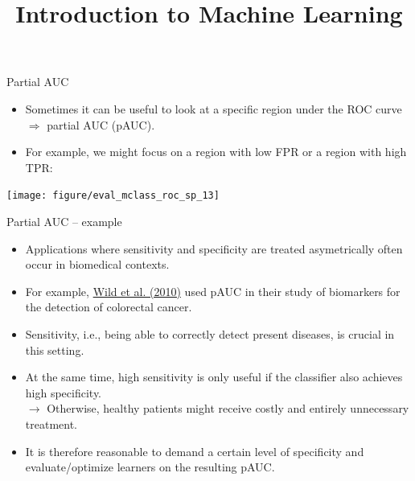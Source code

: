 \documentclass[11pt,compress,t,notes=noshow, xcolor=table]{beamer}
\title{Introduction to Machine Learning}
\institute{\href{https://compstat-lmu.github.io/lecture_i2ml/}{compstat-lmu.github.io/lecture\_i2ml}}
\date{}
\newenvironment{knitrout}{}{} %
\begin{document}








\begin{vbframe}{Partial AUC}

\begin{itemize}
  \item Sometimes it can be useful to look at a specific region under the ROC 
  curve $\Rightarrow$ partial AUC (pAUC).
  \item For example, we might focus on a region with low FPR or a region with 
  high TPR:
\end{itemize}

\begin{knitrout}\scriptsize
{}\color{fgcolor}
{\centering \texttt{[image: figure/eval\_mclass\_roc\_sp\_13]}}
\end{knitrout}

\end{vbframe}


\begin{vbframe}{Partial AUC -- example}

\begin{itemize}
  \item Applications where sensitivity and specificity are treated asymetrically 
  often occur in biomedical contexts.
  \item For example, 
  \href{https://clincancerres.aacrjournals.org/content/16/24/6111}
  {Wild et al. (2010)} used pAUC in their study of biomarkers for the detection 
  of colorectal cancer.
  \item Sensitivity, i.e., being able to correctly detect present diseases, is 
  crucial in this setting.
  \item At the same time, high sensitivity is only useful if the classifier also 
  achieves high specificity. \\
  $\rightarrow$ Otherwise, healthy patients might receive costly and entirely 
  unnecessary treatment.
  \item It is therefore reasonable to demand a certain level of specificity and 
  evaluate/optimize learners on the resulting pAUC.
\end{itemize}

\end{vbframe}
\end{document}
